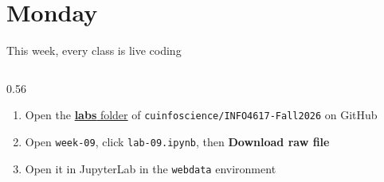 \documentclass[9pt,aspectratio=169]{beamer}
\begin{document}
\section{Monday}

\begin{frame}{This week, every class is live coding}
    \begin{columns}[T]
        \begin{column}{0.56\textwidth}
            \begin{enumerate}\small
                \item Open the \href{https://github.com/cuinfoscience/INFO4617-Fall2026/tree/main/labs}{\textbf{labs} folder} of \texttt{cuinfoscience/INFO4617-Fall2026} on GitHub
                \item Open \texttt{week-09}, click \texttt{lab-09.ipynb}, then \textbf{Download raw file}
                \item Open it in JupyterLab in the \texttt{webdata} environment
            \end{enumerate}


\end{column}
\end{columns}
\end{frame}
\end{document}
